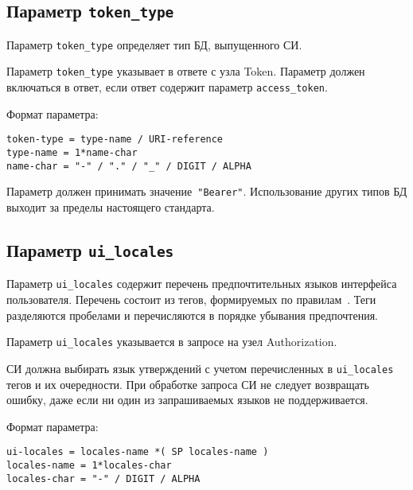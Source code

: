 \subsection{Параметр \lstinline{token_type}}\label{PARAMS.TokenType} 

Параметр \lstinline{token_type} определяет тип БД, выпущенного СИ.

Параметр \lstinline{token_type} указывает в ответе с узла Token.
%
Параметр должен включаться в ответ, если ответ содержит параметр 
\lstinline{access_token}. 

Формат параметра:
\begin{lstlisting}
token-type = type-name / URI-reference
type-name = 1*name-char
name-char = "-" / "." / "_" / DIGIT / ALPHA
\end{lstlisting}

Параметр должен принимать значение~\lstinline{"Bearer"}. 
%
Использование других типов БД выходит за пределы настоящего стандарта. 

\subsection{Параметр \lstinline{ui_locales}}\label{PARAMS.UiLocales}

Параметр \lstinline{ui_locales} содержит перечень предпочтительных 
языков интерфейса пользователя.
%
Перечень состоит из тегов, формируемых по правилам~\cite{RFC5646}. 
%
Теги разделяются пробелами и перечисляются в порядке убывания предпочтения.

Параметр \lstinline{ui_locales} указывается в запросе на узел Authorization.

СИ должна выбирать язык утверждений с учетом перечисленных в 
\lstinline{ui_locales} тегов и их очередности. 
%
При обработке запроса СИ не следует возвращать ошибку, даже если ни один из 
запрашиваемых языков не поддерживается.

Формат параметра:
\begin{lstlisting}
ui-locales = locales-name *( SP locales-name )
locales-name = 1*locales-char
locales-char = "-" / DIGIT / ALPHA
\end{lstlisting}

